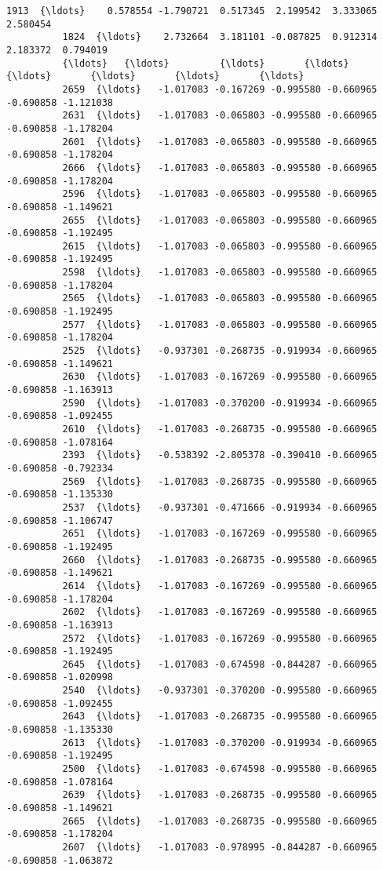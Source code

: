 \documentclass[11pt]{article}
\begin{document}
\begin{Verbatim}[commandchars=\\\{\}]
          1913  {\ldots}    0.578554 -1.790721  0.517345  2.199542  3.333065  2.580454   
          1824  {\ldots}    2.732664  3.181101 -0.087825  0.912314  2.183372  0.794019   
          {\ldots}   {\ldots}         {\ldots}       {\ldots}       {\ldots}       {\ldots}       {\ldots}       {\ldots}   
          2659  {\ldots}   -1.017083 -0.167269 -0.995580 -0.660965 -0.690858 -1.121038   
          2631  {\ldots}   -1.017083 -0.065803 -0.995580 -0.660965 -0.690858 -1.178204   
          2601  {\ldots}   -1.017083 -0.065803 -0.995580 -0.660965 -0.690858 -1.178204   
          2666  {\ldots}   -1.017083 -0.065803 -0.995580 -0.660965 -0.690858 -1.178204   
          2596  {\ldots}   -1.017083 -0.065803 -0.995580 -0.660965 -0.690858 -1.149621   
          2655  {\ldots}   -1.017083 -0.065803 -0.995580 -0.660965 -0.690858 -1.192495   
          2615  {\ldots}   -1.017083 -0.065803 -0.995580 -0.660965 -0.690858 -1.192495   
          2598  {\ldots}   -1.017083 -0.065803 -0.995580 -0.660965 -0.690858 -1.178204   
          2565  {\ldots}   -1.017083 -0.065803 -0.995580 -0.660965 -0.690858 -1.192495   
          2577  {\ldots}   -1.017083 -0.065803 -0.995580 -0.660965 -0.690858 -1.178204   
          2525  {\ldots}   -0.937301 -0.268735 -0.919934 -0.660965 -0.690858 -1.149621   
          2630  {\ldots}   -1.017083 -0.167269 -0.995580 -0.660965 -0.690858 -1.163913   
          2590  {\ldots}   -1.017083 -0.370200 -0.919934 -0.660965 -0.690858 -1.092455   
          2610  {\ldots}   -1.017083 -0.268735 -0.995580 -0.660965 -0.690858 -1.078164   
          2393  {\ldots}   -0.538392 -2.805378 -0.390410 -0.660965 -0.690858 -0.792334   
          2569  {\ldots}   -1.017083 -0.268735 -0.995580 -0.660965 -0.690858 -1.135330   
          2537  {\ldots}   -0.937301 -0.471666 -0.919934 -0.660965 -0.690858 -1.106747   
          2651  {\ldots}   -1.017083 -0.167269 -0.995580 -0.660965 -0.690858 -1.192495   
          2660  {\ldots}   -1.017083 -0.268735 -0.995580 -0.660965 -0.690858 -1.149621   
          2614  {\ldots}   -1.017083 -0.167269 -0.995580 -0.660965 -0.690858 -1.178204   
          2602  {\ldots}   -1.017083 -0.167269 -0.995580 -0.660965 -0.690858 -1.163913   
          2572  {\ldots}   -1.017083 -0.167269 -0.995580 -0.660965 -0.690858 -1.192495   
          2645  {\ldots}   -1.017083 -0.674598 -0.844287 -0.660965 -0.690858 -1.020998   
          2540  {\ldots}   -0.937301 -0.370200 -0.995580 -0.660965 -0.690858 -1.092455   
          2643  {\ldots}   -1.017083 -0.268735 -0.995580 -0.660965 -0.690858 -1.135330   
          2613  {\ldots}   -1.017083 -0.370200 -0.919934 -0.660965 -0.690858 -1.192495   
          2500  {\ldots}   -1.017083 -0.674598 -0.995580 -0.660965 -0.690858 -1.078164   
          2639  {\ldots}   -1.017083 -0.268735 -0.995580 -0.660965 -0.690858 -1.149621   
          2665  {\ldots}   -1.017083 -0.268735 -0.995580 -0.660965 -0.690858 -1.178204   
          2607  {\ldots}   -1.017083 -0.978995 -0.844287 -0.660965 -0.690858 -1.063872   
          

\end{Verbatim}
\end{document}
